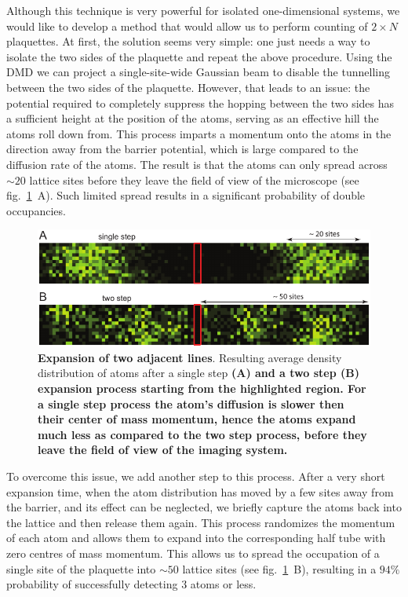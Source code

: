 Although this technique is very powerful for isolated one-dimensional systems, we would like to develop a method that would allow us to perform counting of $2\times N$ plaquettes. At first, the solution seems very simple: one just needs a way to isolate the two sides of the plaquette and repeat the above procedure. Using the DMD we can project a single-site-wide Gaussian beam to disable the tunnelling between the two sides of the plaquette. However, that leads to an issue: the potential required to completely suppress the hopping between the two sides has a sufficient height at the position of the atoms, serving as an effective hill the atoms roll down from. This process imparts a momentum onto the atoms in the direction away from the barrier potential, which is large compared to the diffusion rate of the atoms. The result is that the atoms can only spread across $\sim 20$ lattice sites before they leave the field of view of the microscope (see fig.~\ref{fig:CTE_expansion}~A). Such limited spread results in a significant probability of double occupancies.

\begin{figure}[t]
	\centering
	\includegraphics[scale=1]{figures/CTE_expansion.pdf}
	\caption{{\bf Expansion of two adjacent lines}. Resulting average density distribution of atoms after a single step \bf{(A)} and a two step \bf{(B)} expansion process starting from the highlighted region. For a single step process the atom's diffusion is slower then their center of mass momentum, hence the atoms expand much less as compared to the two step process, before they leave the field of view of the imaging system.}
	\label{fig:CTE_expansion}
\end{figure}

To overcome this issue, we add another step to this process. After a very short expansion time, when the atom distribution has moved by a few sites away from the barrier, and its effect can be neglected, we briefly capture the atoms back into the lattice and then release them again. This process randomizes the momentum of each atom and allows them to expand into the corresponding half tube with zero centres of mass momentum. This allows us to spread the occupation of a single site of the plaquette into $\sim 50$ lattice sites (see fig.~\ref{fig:CTE_expansion}~B), resulting in a $94\%$ probability of successfully detecting $3$ atoms or less. 
